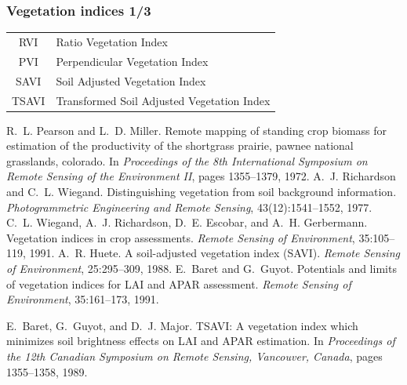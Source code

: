 \documentclass[compress]{beamer}
\begin{document}
\begin{frame}
\frametitle{Vegetation indices 1/3}
\footnotesize  \centering
\begin{tabular}{|c|l|}
\hline
RVI &  Ratio Vegetation Index \cite{Pearson1972-RVI}\\
PVI & Perpendicular Vegetation Index \cite{Richardson1977-PVI,Wiegand1991-PVI}\\ 
SAVI & Soil Adjusted Vegetation Index \cite{Huete1988-SAVI} \\
TSAVI & Transformed Soil Adjusted Vegetation Index \cite{Baret1989-TSAVI,Baret1991-TSAVI} \\
\hline
\end{tabular}
\begin{thebibliography}{noidea}
\tiny
{}
R.~L. Pearson and L.~D. Miller. Remote mapping of standing crop biomass for estimation of the
  productivity of the shortgrass prairie, pawnee national grasslands,
        colorado.  In {\em Proceedings of the 8th International Symposium on Remote
  Sensing of the Environment II}, pages 1355--1379, 1972.
A.~J. Richardson and C.~L. Wiegand.
 Distinguishing vegetation from soil background information.
 {\em Photogrammetric Engineering and Remote Sensing},
  43(12):1541--1552, 1977.
C.~L. Wiegand, A.~J. Richardson, D.~E. Escobar, and A.~H. Gerbermann.
 Vegetation indices in crop assessments.
 {\em Remote Sensing of Environment}, 35:105--119, 1991.
A.~R. Huete.
 A soil-adjusted vegetation index ({SAVI}).
 {\em Remote Sensing of Environment}, 25:295--309, 1988.
E.~Baret and G.~Guyot.
 Potentials and limits of vegetation indices for {LAI} and {APAR}
  assessment.
 {\em Remote Sensing of Environment}, 35:161--173, 1991.

E.~Baret, G.~Guyot, and D.~J. Major.
 {TSAVI}: A vegetation index which minimizes soil brightness effects
  on {LAI} and {APAR} estimation.
 In {\em Proceedings of the 12th Canadian Symposium on Remote Sensing,
  Vancouver, Canada}, pages 1355--1358, 1989.
\end{thebibliography}
\end{frame}
\end{document}
